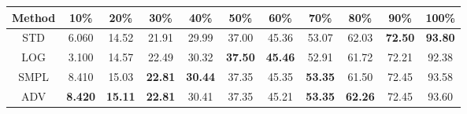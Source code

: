 \documentclass{standalone}
\begin{document}
\begin{tabular}{c|cccccccccc}
      \toprule
      Method & 10\% & 20\% & 30\% & 40\% & 50\% & 60\% & 70\% & 80\% & 90\% & 100\% \\
      \midrule
STD & 6.060 & 14.52 & 21.91 & 29.99 & 37.00 & 45.36 & 53.07 & 62.03 & \textbf{72.50} & \textbf{93.80}\\
LOG & 3.100 & 14.57 & 22.49 & 30.32 & \textbf{37.50} & \textbf{45.46} & 52.91 & 61.72 & 72.21 & 92.38\\
SMPL & 8.410 & 15.03 & \textbf{22.81} & \textbf{30.44} & 37.35 & 45.35 & \textbf{53.35} & 61.50 & 72.45 & 93.58\\
ADV & \textbf{8.420} & \textbf{15.11} & \textbf{22.81} & 30.41 & 37.35 & 45.21 & \textbf{53.35} & \textbf{62.26} & 72.45 & 93.60\\
  \bottomrule
\end{tabular}
\end{document}
